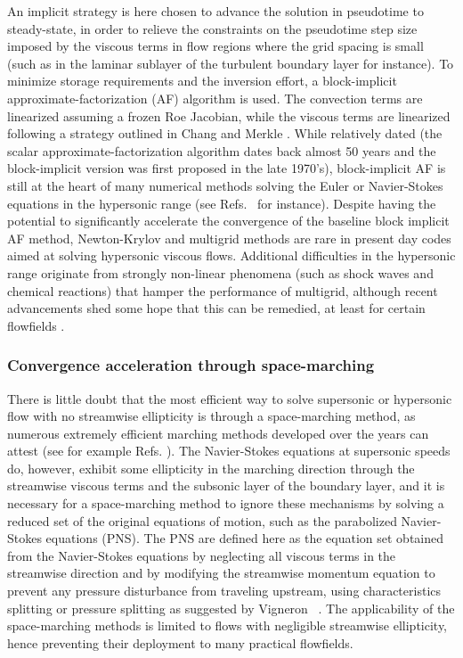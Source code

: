 An implicit strategy is here chosen to advance the solution in pseudotime
to steady-state, in order to relieve the constraints on the pseudotime step size
imposed by the viscous terms in flow regions where the grid spacing is small
(such as in the laminar sublayer of the turbulent boundary layer for instance).
To minimize storage requirements and the inversion effort,
a block-implicit approximate-factorization (AF) algorithm
\cite{jcp:1977:briley, aiaa:1978:beam} is used.
The convection terms are linearized assuming a frozen Roe Jacobian, while
the viscous terms are linearized following a strategy outlined
in Chang and Merkle \cite{jcp:1989:chang}.
While relatively dated (the scalar approximate-factorization
algorithm dates back almost 50 years and the block-implicit version was
first proposed in the late 1970's), block-implicit AF
is still at the heart
of many numerical methods solving the Euler or Navier-Stokes equations in the
hypersonic range (see Refs.~\cite{aiaaconf:1997:maccormack,cf:2001:maccormack}
for instance). Despite having the potential to significantly accelerate the
convergence of the baseline block implicit AF method,
Newton-Krylov and multigrid methods are rare in
present day codes aimed at solving hypersonic viscous flows. Additional difficulties
in the hypersonic range originate from strongly non-linear phenomena (such as
shock waves and chemical reactions) that hamper the performance of multigrid,
although recent advancements shed some hope that this can be remedied,
at least for certain flowfields \cite{jcp:2001:gerlinger}.


\subsubsection{Convergence acceleration through space-marching}

There is little doubt that the most efficient way to solve
supersonic or hypersonic flow with no streamwise ellipticity is
through a space-marching method, as numerous extremely efficient
marching methods developed over the years can attest (see for example Refs.
\cite{aiaaconf:1978:vigneron,aiaaconf:1986:lawrence,aiaaconf:1988:tannehill,
cf:1997:dambrosio,cf:1998:miller}). The Navier-Stokes equations at supersonic
speeds do, however, exhibit some ellipticity in the marching direction through
the streamwise viscous terms and the subsonic layer of the boundary layer,
and it is necessary for a space-marching method to ignore these mechanisms by
solving a reduced set of the original equations of motion, such as
the parabolized Navier-Stokes equations (PNS). The PNS are defined here as
the equation set obtained
from the Navier-Stokes equations by neglecting all viscous terms in the
streamwise direction and by modifying the streamwise momentum equation to
prevent any pressure
disturbance from traveling upstream, using characteristics splitting or pressure
splitting as suggested by Vigneron \etal\ \cite{aiaaconf:1978:vigneron}.
The applicability of the space-marching methods is
limited to flows with negligible streamwise ellipticity, hence preventing their
deployment to many practical flowfields.


